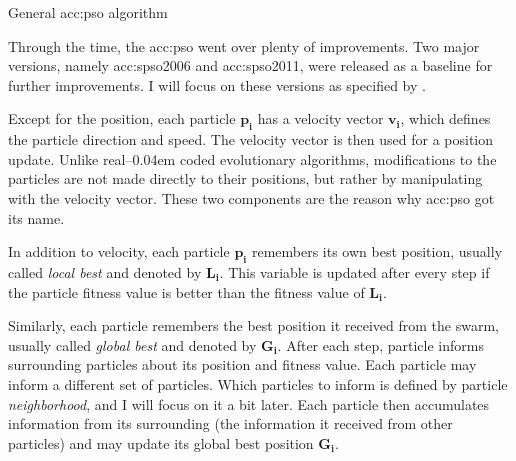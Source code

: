 \begin{algorithm}[b!]
    \caption{General \acrfull*{acc:pso} algorithm}
    \label{alg:PSOgeneral}
\end{algorithm}

Through the time, the \acrshort{acc:pso} went over plenty of improvements. Two major versions, namely \acrfull{acc:spso2006} and \acrfull{acc:spso2011}, were released as a baseline for further improvements. I will focus on these versions as specified by \citet{SPSO}.

Except for the position, each particle $\mathbf{p_i}$ has a velocity vector $\mathbf{v_i}$, which defines the particle direction and speed. The velocity vector is then used for a position update. Unlike real--\kern0.04em coded evolutionary algorithms, modifications to the particles are not made directly to their positions, but rather by manipulating with the velocity vector. These two components are the reason why \acrshort{acc:pso} got its name.

In addition to velocity, each particle $\mathbf{p_i}$ remembers its own best position, usually called \emph{local best} and denoted by $\mathbf{L_i}$. This variable is updated after every step if the particle fitness value is better than the fitness value of $\mathbf{L_i}$.

Similarly, each particle remembers the best position it received from the swarm, usually called \emph{global best} and denoted by $\mathbf{G_i}$. After each step, particle informs surrounding particles about its position and fitness value. Each particle may inform a different set of particles. Which particles to inform is defined by particle \emph{neighborhood}, and I will focus on it a bit later. Each particle then accumulates information from its surrounding (the information it received from other particles) and may update its global best position $\mathbf{G_i}$.


